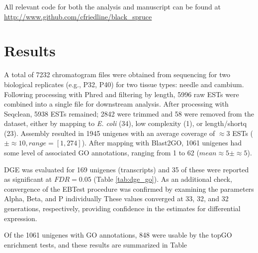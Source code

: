\documentclass[11pt]{article}
\begin{document}
All relevant code for both the analysis and manuscript can be found at
\url{http://www.github.com/cfriedline/black_spruce}

\section*{Results}

A total of 7232 chromatogram files were obtained from sequencing for
two biological replicates (e.g., P32, P40) for two tissue types:
needle and cambium.  Following processing with Phred and filtering by
length, 5996 raw ESTs were combined into a single file for downstream
analysis.  After processing with Seqclean, 5938 ESTs remained; 2842
were trimmed and 58 were removed from the dataset, either by mapping
to \textit{E. coli} (34), low complexity (1), or length/shortq (23).
Assembly resulted in 1945 unigenes with an average coverage of
$\approx{3}$ ESTs ($\pm \approx{10}, range=[1,274]$). After mapping 
with Blast2GO, 1061 unigenes had some level of associated GO annotations, 
ranging from 1 to 62 ($mean \approx{5} \pm \approx{5}$).

DGE was evaluated for 169 unigenes (transcripts) and 35 of these were
reported as significant at $FDR = 0.05$ (Table \ref{tab:dge_go}). As an additional check,
convergence of the EBTest procedure was confirmed by examining the
parameters Alpha, Beta, and P individually These values converged at
33, 32, and 32 generations, respectively, providing confidence in the
estimates for differential expression.

Of the 1061 unigenes with GO annotations, 848 were usable by the 
topGO enrichment tests, and these results are summarized in Table 




\clearpage

\singlespacing



\clearpage
\end{document}

